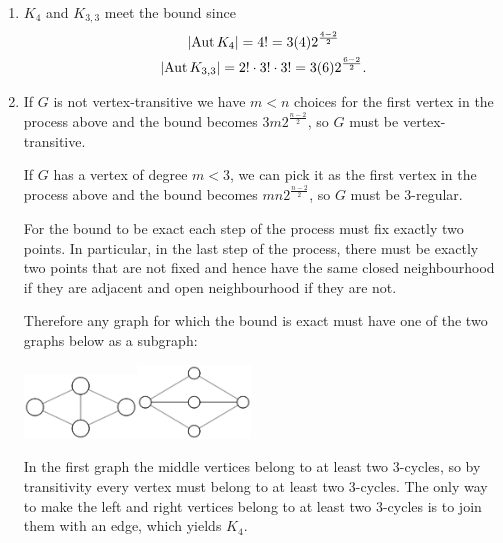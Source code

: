 \documentclass[a4paper, 12pt]{article}
\DeclarePairedDelimiter\abs{\lvert}{\rvert}
\DeclareMathOperator{\aut}{Aut}
\begin{document}
\begin{enumerate}
\begin{enumerate}
\item \(K_4\) and \(K_{3,3}\) meet the bound since
\begin{gather*}
\abs{\aut K_4}=4!=3(4)2^{\frac{4-2}2}\\
\abs{\aut K_{3,3}}=2!\cdot3!\cdot3!=3(6)2^{\frac{6-2}2}.
\end{gather*}

\item If \(G\) is not vertex-transitive we have \(m<n\) choices for the first vertex in the process above and the bound becomes \(3m2^{\frac{n-2}2}\), so \(G\) must be vertex-transitive.

If \(G\) has a vertex of degree \(m<3\), we can pick it as the first vertex in the process above and the bound becomes \(mn2^{\frac{n-2}2}\), so \(G\) must be 3-regular.

For the bound to be exact each step of the process must fix exactly two points. In particular, in the last step of the process, there must be exactly two points that are not fixed and hence have the same closed neighbourhood if they are adjacent and open neighbourhood if they are not.

Therefore any graph for which the bound is exact must have one of the two graphs below as a subgraph:
\begin{center}
\includegraphics[valign=c, width=3cm]{g}\hspace{3em}\includegraphics[valign=c, width=3cm]{k}
\end{center}
In the first graph the middle vertices belong to at least two 3-cycles, so by transitivity every vertex must belong to at least two 3-cycles. The only way to make the left and right vertices belong to at least two 3-cycles is to join them with an edge, which yields \(K_4\).


\end{enumerate}
\end{enumerate}
\end{document}
